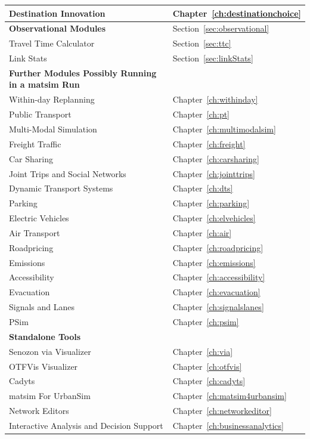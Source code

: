 \begin{center}
\begin{longtable}{|l|l|}
	Destination Innovation & Chapter~\ref{ch:destinationchoice} \\
	\hline
	\textbf{Observational Modules} & Section~\ref{sec:observational} \\
	\hline
	Travel Time Calculator & Section~\ref{sec:ttc} \\
	Link Stats & Section~\ref{sec:linkStats} \\
	\hline
	\textbf{Further Modules Possibly Running in a \gls{matsim} Run} & \\
	\hline
	Within-day Replanning & Chapter~\ref{ch:withinday} \\
	Public Transport & Chapter~\ref{ch:pt} \\
	Multi-Modal Simulation & Chapter~\ref{ch:multimodalsim} \\
	Freight Traffic & Chapter~\ref{ch:freight} \\
	Car Sharing & Chapter~\ref{ch:carsharing} \\
	Joint Trips and Social Networks & Chapter~\ref{ch:jointtrips} \\
	Dynamic Transport Systems & Chapter~\ref{ch:dts} \\
	Parking & Chapter~\ref{ch:parking} \\
	Electric Vehicles & Chapter~\ref{ch:elvehicles} \\
	Air Transport & Chapter~\ref{ch:air} \\
	Roadpricing & Chapter~\ref{ch:roadpricing} \\
	Emissions & Chapter~\ref{ch:emissions} \\
	Accessibility & Chapter~\ref{ch:accessibility} \\
	Evacuation & Chapter~\ref{ch:evacuation}  \\
	Signals and Lanes & Chapter~\ref{ch:signalslanes} \\
	PSim & Chapter~\ref{ch:psim} \\
	\hline
	\textbf{Standalone Tools} & \\ %
	\hline
	Senozon via Visualizer & Chapter~\ref{ch:via} \\
	OTFVis Visualizer & Chapter~\ref{ch:otfvis} \\
	Cadyts & Chapter~\ref{ch:cadyts} \\
	\gls{matsim} For UrbanSim & Chapter~\ref{ch:matsim4urbansim} \\	
	Network Editors &  Chapter~\ref{ch:networkeditor} \\
	Interactive Analysis and Decision Support & Chapter~\ref{ch:businessanalytics} \\
\end{longtable}
\end{center}

